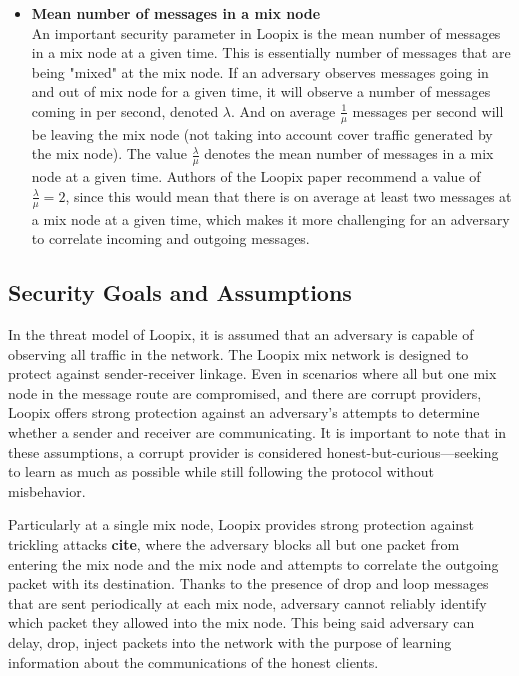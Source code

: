 \documentclass[a4paper,11pt,oneside]{report}
\begin{document}
\begin{itemize}
\item \textbf{Mean number of messages in a mix node} \\
\label{item:lambda_over_mu}
An important security parameter in Loopix is the mean number of messages in a mix node at a given time. This is essentially number of messages that are being "mixed" at the mix node. If an adversary observes messages going in and out of mix node for a given time, it will observe a number of messages coming in per second, denoted \(\lambda\). And on average \(\frac{1}{\mu}\) messages per second will be leaving the mix node (not taking into account cover traffic generated by the mix node). The value \(\frac{\lambda}{\mu}\) denotes the mean number of messages in a mix node at a given time. Authors of the Loopix paper recommend a value of \(\frac{\lambda}{\mu} = 2\), since this would mean that there is on average at least two messages at a mix node at a given time, which makes it more challenging for an adversary to correlate incoming and outgoing messages.
\end{itemize}

\subsection{Security Goals and Assumptions}
\label{sec:loopix_assumptions}
In the threat model of Loopix, it is assumed that an adversary is capable of observing all traffic in the network. The Loopix mix network is designed to protect against sender-receiver linkage. Even in scenarios where all but one mix node in the message route are compromised, and there are corrupt providers, Loopix offers strong protection against an adversary's attempts to determine whether a sender and receiver are communicating. It is important to note that in these assumptions, a corrupt provider is considered honest-but-curious—seeking to learn as much as possible while still following the protocol without misbehavior.

Particularly at a single mix node, Loopix provides strong protection against trickling attacks \textbf{cite}, where the adversary blocks all but one packet from entering the mix node and the mix node and attempts to correlate the outgoing packet with its destination. Thanks to the presence of drop and loop messages that are sent periodically at each mix node, adversary cannot reliably identify which packet they allowed into the mix node. This being said adversary can delay, drop, inject packets into the network with the purpose of learning information about the communications of the honest clients.
\end{document}
